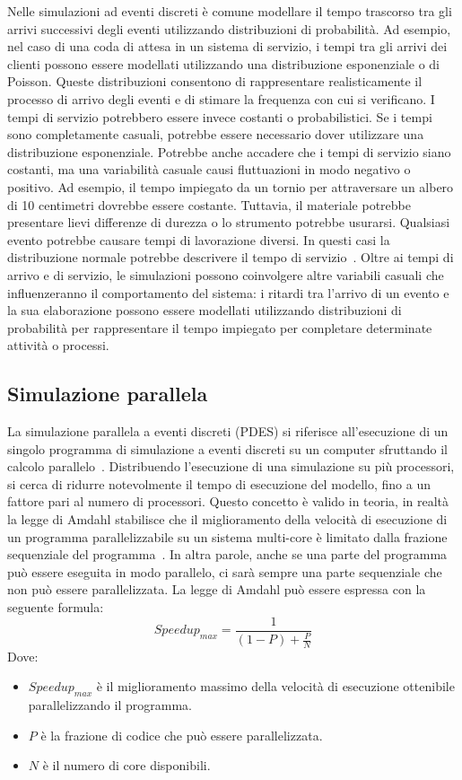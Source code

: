 \documentclass[12pt,a4paper,openright,twoside]{book}
\begin{document}
Nelle simulazioni ad eventi discreti è comune modellare il tempo trascorso tra gli arrivi successivi degli eventi utilizzando distribuzioni di probabilità. 
Ad esempio, nel caso di una coda di attesa in un sistema di servizio, i tempi tra gli arrivi dei clienti possono essere modellati utilizzando una distribuzione esponenziale o di Poisson. Queste distribuzioni consentono di rappresentare realisticamente il processo di arrivo degli eventi e di stimare la frequenza con cui si verificano.
I tempi di servizio potrebbero essere invece costanti o probabilistici. Se i tempi sono completamente casuali, potrebbe essere necessario dover utilizzare una distribuzione esponenziale. Potrebbe anche accadere che i tempi di servizio siano costanti, ma una variabilità casuale causi fluttuazioni in modo negativo o positivo. Ad esempio, il tempo impiegato da un tornio per attraversare un albero di 10 centimetri dovrebbe essere costante. Tuttavia, il materiale potrebbe presentare lievi differenze di durezza o lo strumento potrebbe usurarsi. Qualsiasi evento potrebbe causare tempi di lavorazione diversi. In questi casi la distribuzione normale potrebbe descrivere il tempo di servizio~\cite{DBLP:books/daglib/0034857}.
Oltre ai tempi di arrivo e di servizio, le simulazioni possono coinvolgere altre variabili casuali che influenzeranno il comportamento del sistema: i ritardi tra l'arrivo di un evento e la sua elaborazione possono essere modellati utilizzando distribuzioni di probabilità per rappresentare il tempo impiegato per completare determinate attività o processi. 

\subsection{Simulazione parallela}
La simulazione parallela a eventi discreti (PDES) si riferisce all'esecuzione di un singolo programma di simulazione a eventi discreti su un computer sfruttando il calcolo parallelo~\cite{DBLP:journals/cacm/Fujimoto90}. Distribuendo l'esecuzione di una simulazione su più processori, si cerca di ridurre notevolmente il tempo di esecuzione del modello, fino a un fattore pari al numero di processori. Questo concetto è valido in teoria, in realtà la legge di Amdahl stabilisce che il miglioramento della velocità di esecuzione di un programma parallelizzabile su un sistema multi-core è limitato dalla frazione sequenziale del programma~\cite{DBLP:conf/afips/Amdahl67}. In altra parole, anche se una parte del programma può essere eseguita in modo parallelo, ci sarà sempre una parte sequenziale che non può essere parallelizzata. La legge di Amdahl può essere espressa con la seguente formula: 
$$
Speedup_{max} = \frac{1}{(1-P)+\frac{P}{N}}
$$
Dove: 
\begin{itemize}
    \item $Speedup_{max}$ è il miglioramento massimo della velocità di esecuzione ottenibile parallelizzando il programma. 
    \item $P$ è la frazione di codice che può essere parallelizzata. 
    \item $N$ è il numero di core disponibili.
\end{itemize}
\end{document}
